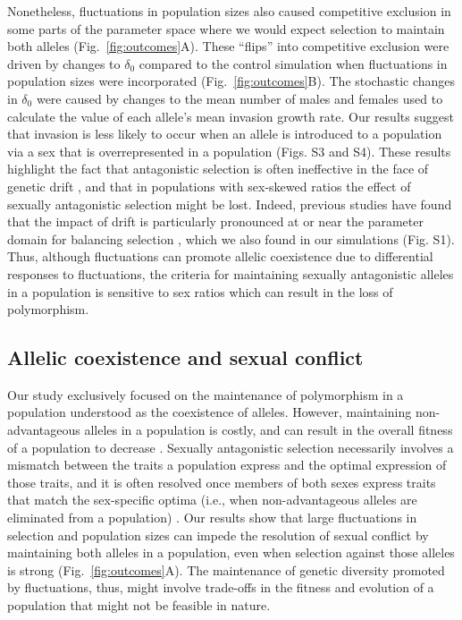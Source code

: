 Nonetheless, fluctuations in population sizes also caused competitive exclusion in some parts of the parameter space where we would expect selection to maintain both alleles (Fig.~\ref{fig:outcomes}A). These ``flips'' into competitive exclusion were driven by changes to $\delta_{0}$ compared to the control simulation when fluctuations in population sizes were incorporated (Fig.~\ref{fig:outcomes}B). The stochastic changes in $\delta_{0}$ were caused by changes to the mean number of males and females used to calculate the value of each allele's mean invasion growth rate. Our results suggest that invasion is less likely to occur when an allele is introduced to a population via a sex that is overrepresented in a population (Figs. S3 and S4).  These results highlight the fact that antagonistic selection is often ineffective in the face of genetic drift \citep{connallon2012general}, and that in populations with sex-skewed ratios the effect of sexually antagonistic selection might be lost. Indeed, previous studies have found that the impact of drift is particularly pronounced at or near the parameter domain for balancing selection \citep{connallon2012general}, which we also found in our simulations (Fig. S1). Thus, although fluctuations can promote allelic coexistence due to differential responses to fluctuations, the criteria for maintaining sexually antagonistic alleles in a population is sensitive to sex ratios which can result in the loss of polymorphism.




\subsection*{Allelic coexistence and sexual conflict}

Our study exclusively focused on the maintenance of polymorphism in a population understood as the coexistence of alleles. However, maintaining non-advantageous alleles in a population is costly, and can result in the overall fitness of a population to decrease  \citep{connallon2018environmental}. Sexually antagonistic selection necessarily involves a mismatch between the traits a population express and the optimal expression of those traits, and it is often resolved once members of both sexes express traits that match the sex-specific optima (i.e., when non-advantageous alleles are eliminated from a population) \citep{lande1980sexual}. Our results show that large fluctuations in selection and population sizes can impede the resolution of sexual conflict by maintaining both alleles in a population, even when selection against those alleles is strong (Fig.~\ref{fig:outcomes}A). The maintenance of genetic diversity promoted by fluctuations, thus, might involve trade-offs in the fitness and evolution of a population that might not be feasible in nature.



